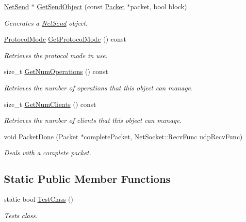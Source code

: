 \begin{DoxyCompactItemize}
\hyperlink{class_net_send}{NetSend} $\ast$ \hyperlink{class_net_mode_udp_per_client_a6a6a8cd7ebf9d72760b2f328a64e5a0e}{GetSendObject} (const \hyperlink{class_packet}{Packet} $\ast$packet, bool block)
\begin{DoxyCompactList}\small\item\em Generates a \hyperlink{class_net_send}{NetSend} object. \item\end{DoxyCompactList}\item 
\hyperlink{class_net_mode_a43cfa55ee6a4db66a8d7d6c27f766964}{ProtocolMode} \hyperlink{class_net_mode_udp_per_client_ad179a96106a20668f1dd1fe5c37e5034}{GetProtocolMode} () const 
\begin{DoxyCompactList}\small\item\em Retrieves the protocol mode in use. \item\end{DoxyCompactList}\item 
size\_\-t \hyperlink{class_net_mode_udp_per_client_a4756d963af49213282ebfe90c63cd1ba}{GetNumOperations} () const 
\begin{DoxyCompactList}\small\item\em Retrieves the number of operations that this object can manage. \item\end{DoxyCompactList}\item 
size\_\-t \hyperlink{class_net_mode_udp_per_client_a7c53b77684eb18b997182f7c8c861b8f}{GetNumClients} () const 
\begin{DoxyCompactList}\small\item\em Retrieves the number of clients that this object can manage. \item\end{DoxyCompactList}\item 
void \hyperlink{class_net_mode_udp_per_client_a1c3fb35fb139bb8aeeedb79db890fa28}{PacketDone} (\hyperlink{class_packet}{Packet} $\ast$completePacket, \hyperlink{class_net_socket_a52b5f4de8d0a47fd8620f542b21c076c}{NetSocket::RecvFunc} udpRecvFunc)
\begin{DoxyCompactList}\small\item\em Deals with a complete packet. \item\end{DoxyCompactList}\end{DoxyCompactItemize}
\subsection*{Static Public Member Functions}
\begin{DoxyCompactItemize}
\item 
static bool \hyperlink{class_net_mode_udp_per_client_a490edbb5bd9886e5a308e8d7333c7b54}{TestClass} ()
\begin{DoxyCompactList}\small\item\em Tests class. \item\end{DoxyCompactList}\end{DoxyCompactItemize}
